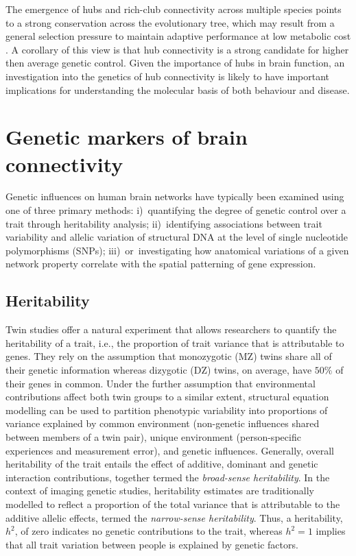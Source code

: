 The emergence of hubs and rich-club connectivity across multiple species points to a strong conservation across the evolutionary tree, which may result from a general selection pressure to maintain adaptive performance at low metabolic cost \citep{Bullmore2012}. A corollary of this view is that hub connectivity is a strong candidate for higher then average genetic control. Given the importance of hubs in brain function, an investigation into the genetics of hub connectivity is likely to have important implications for understanding the molecular basis of both behaviour and disease.
\section{Genetic markers of brain connectivity}

Genetic influences on human brain networks have typically been examined using one of three primary methods: \mbox{i) quantifying} the degree of genetic control over a trait through heritability analysis; \mbox{ii) identifying} associations between trait variability and allelic variation of structural DNA at the level of single nucleotide polymorphisms (SNPs); \mbox{iii) or investigating} how anatomical variations of a given network property correlate with the spatial patterning of gene expression.

\subsection{Heritability}

Twin studies offer a natural experiment that allows researchers to quantify the heritability of a trait, i.e., the proportion of trait variance that is attributable to genes. They rely on the assumption that monozygotic (MZ) twins share all of their genetic information whereas dizygotic (DZ) twins, on average, have $50\%$ of their genes in common. Under the further assumption that environmental contributions affect both twin groups to a similar extent, structural equation modelling can be used to partition phenotypic variability into proportions of variance explained by common environment (non-genetic influences shared between members of a twin pair), unique environment (person-specific experiences and measurement error), and genetic influences. Generally, overall heritability of the trait entails the effect of additive, dominant and genetic interaction contributions, together termed the \textit{broad-sense heritability}. In the context of imaging genetic studies, heritability estimates are traditionally modelled to reflect a proportion of the total variance that is attributable to the additive allelic effects, termed the \textit{narrow-sense heritability}. Thus, a heritability, $h^{2}$, of zero indicates no genetic contributions to the trait, whereas $h^{2}=1$ implies that all trait variation between people is explained by genetic factors.

